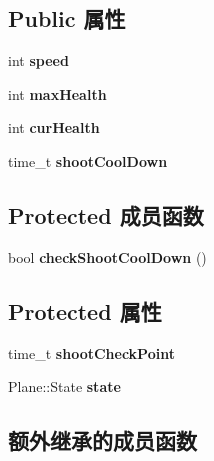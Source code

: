 \subsection*{Public 属性}
\begin{DoxyCompactItemize}
\item 
\mbox{\label{class_plane_a6ca15b26a453dfd4f81fa11a5ee278c9}} 
int {\bfseries speed}
\item 
\mbox{\label{class_plane_ac39ded6721a8137c4a8044adfbfb8a6c}} 
int {\bfseries max\+Health}
\item 
\mbox{\label{class_plane_a0434f35fe3f56acb865e51c042e43df8}} 
int {\bfseries cur\+Health}
\item 
\mbox{\label{class_plane_aee6743aa4af2550eb0581d52d0e0cafb}} 
time\+\_\+t {\bfseries shoot\+Cool\+Down}
\end{DoxyCompactItemize}
\subsection*{Protected 成员函数}
\begin{DoxyCompactItemize}
\item 
\mbox{\label{class_plane_a77bd3df33921e215669be6583619ee45}} 
bool {\bfseries check\+Shoot\+Cool\+Down} ()
\end{DoxyCompactItemize}
\subsection*{Protected 属性}
\begin{DoxyCompactItemize}
\item 
\mbox{\label{class_plane_a04cbdef01529e67a2460f7aa4e8e6826}} 
time\+\_\+t {\bfseries shoot\+Check\+Point}
\item 
\mbox{\label{class_plane_a15487608040be61f78e1364261f23605}} 
Plane\+::\+State {\bfseries state}
\end{DoxyCompactItemize}
\subsection*{额外继承的成员函数}



